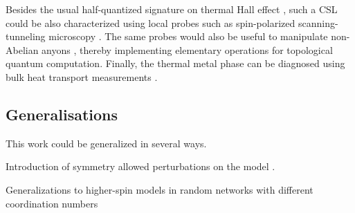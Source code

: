 Besides the usual half-quantized signature on thermal Hall effect
\autocite{Kasahara2018,Yokoi2021,Yamashita2020,Bruin2022}, such a CSL
could be also characterized using local probes such as spin-polarized
scanning-tunneling microscopy
\autocite{Feldmeier2020,Konig2020,Udagawa2021}. The same probes would
also be useful to manipulate non-Abelian anyons \autocite{Pereira2020},
thereby implementing elementary operations for topological quantum
computation. Finally, the thermal metal phase can be diagnosed using
bulk heat transport measurements \autocite{Beenakker2013}.

\hypertarget{generalisations}{%
\subsection{Generalisations}\label{generalisations}}

This work could be generalized in several ways.

Introduction of symmetry allowed perturbations on the model
\autocite{Rau2014,Chaloupka2010,Chaloupka2013,Chaloupka2015,Winter2016}.

Generalizations to higher-spin models in random networks with different
coordination numbers
\autocite{Baskaran2008,Yao2009,Nussinov2009,Yao2011,Chua2011,Natori2020,Chulliparambil2020,Chulliparambil2021,Seifert2020,WangHaoranPRB2021,Wu2009}
